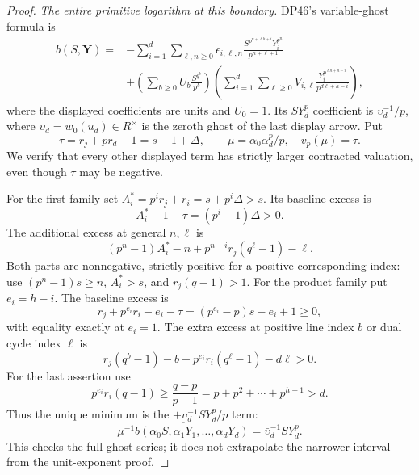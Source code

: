 \documentclass[11pt,a4paper]{article}
\theoremstyle{definition}\newtheorem{remark}[theorem]{Remark}
\newcommand{\vp}{v_p}\newcommand{\dR}{\mathrm{dR}}\newcommand{\crys}{\mathrm{crys}}
\begin{document}
\begin{proof}
\emph{The entire primitive logarithm at this boundary.}
DP46's variable-ghost formula is
\begin{align*}
 b(S,\mathbf Y)
 ={}&-\sum_{i=1}^d\sum_{\ell,n\ge0}
 \epsilon_{i,\ell,n}
 \frac{S^{p^{n+\ell h+i}}Y_i^{p^n}}{p^{n+\ell+1}}\\
 &+\left(\sum_{b\ge0}U_b\frac{S^{q^b}}{p^b}\right)
   \left(\sum_{i=1}^d\sum_{\ell\ge0}
       V_{i,\ell}\frac{Y_i^{p^{\ell h+h-i}}}{p^{d\ell+h-i}}\right),
\end{align*}
where the displayed coefficients are units and $U_0=1$.
Its $SY_d^p$ coefficient is $\upsilon_d^{-1}/p$, where
$\upsilon_d=w_0(u_d)\in R^\times$ is the zeroth ghost of the last display arrow.
Put
\[
 \tau=r_j+pr_d-1=s-1+\Delta,\qquad
 \mu=\alpha_0\alpha_d^p/p,
 \quad\vp(\mu)=\tau.
\]
We verify that every other displayed term has strictly larger contracted valuation, even though $\tau$ may be negative.

For the first family set $A_i^*=p^ir_j+r_i=s+p^i\Delta>s$.
Its baseline excess is
\[
 A_i^*-1-\tau=(p^i-1)\Delta>0.
\]
The additional excess at general $n,\ell$ is
\[
 (p^n-1)A_i^*-n+p^{n+i}r_j(q^\ell-1)-\ell.
\]
Both parts are nonnegative, strictly positive for a positive corresponding index: use $(p^n-1)s\ge n$, $A_i^*>s$, and $r_j(q-1)>1$.
For the product family put $e_i=h-i$. The baseline excess is
\[
 r_j+p^{e_i}r_i-e_i-\tau
       =(p^{e_i}-p)s-e_i+1\ge0,
\]
with equality exactly at $e_i=1$.
The extra excess at positive line index $b$ or dual cycle index $\ell$ is
\[
 r_j(q^b-1)-b+p^{e_i}r_i(q^\ell-1)-d\ell>0.
\]
For the last assertion use
\[
 p^{e_i}r_i(q-1)\ge\frac{q-p}{p-1}
       =p+p^2+\cdots+p^{h-1}>d.
\]
Thus the unique minimum is the $+\upsilon_d^{-1}SY_d^p/p$ term:
\begin{equation}\label{eq:nonunitloginitial}
 \overline{\mu^{-1}b(\alpha_0S,\alpha_1Y_1,\ldots,\alpha_dY_d)}
       =\bar\upsilon_d^{-1}SY_d^p.
\end{equation}
This checks the full ghost series; it does not extrapolate the narrower interval from the unit-exponent proof.


\end{proof}
\end{document}
